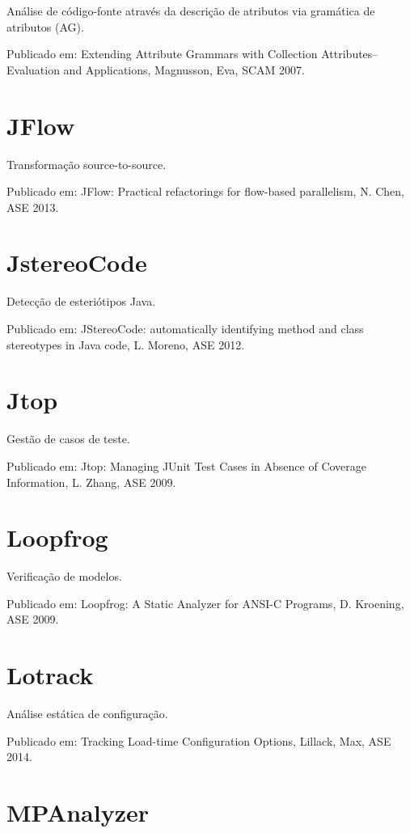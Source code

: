 Análise de código-fonte através da descrição de atributos via gramática de atributos (AG).

Publicado em: Extending Attribute Grammars with Collection Attributes--Evaluation and Applications,
Magnusson, Eva,
SCAM
2007.

\section{JFlow}

Transformação source-to-source.

Publicado em: JFlow: Practical refactorings for flow-based parallelism,
N. Chen,
ASE
2013.

\section{JstereoCode}

Detecção de esteriótipos Java.

Publicado em: JStereoCode: automatically identifying method and class stereotypes in Java code,
L. Moreno,
ASE
2012.

\section{Jtop}

Gestão de casos de teste.

Publicado em: Jtop: Managing JUnit Test Cases in Absence of Coverage Information,
L. Zhang,
ASE
2009.

\section{Loopfrog}

Verificação de modelos.

Publicado em: Loopfrog: A Static Analyzer for ANSI-C Programs,
D. Kroening,
ASE
2009.

\section{Lotrack}

Análise estática de configuração.

Publicado em: Tracking Load-time Configuration Options,
Lillack, Max,
ASE
2014.

\section{MPAnalyzer}

